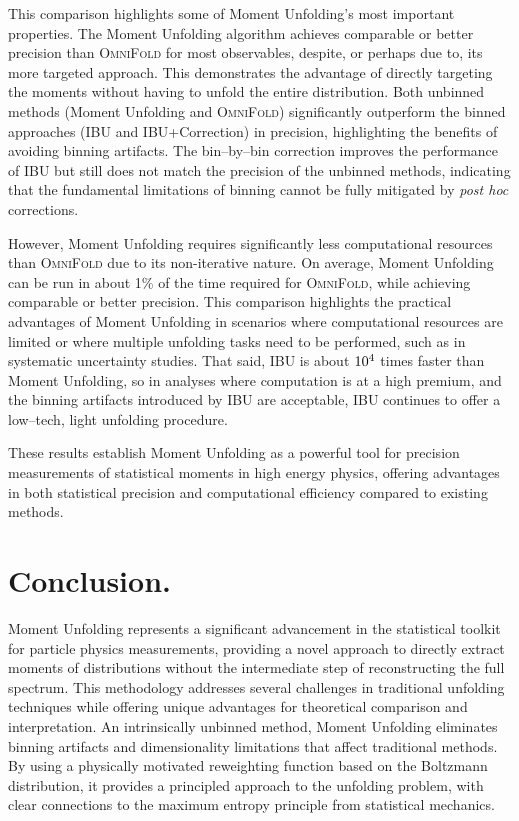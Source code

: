     This comparison highlights some of Moment Unfolding's most important properties.
    The Moment Unfolding algorithm achieves comparable or better precision than \textsc{\textsc{OmniFold}} for most observables, despite, or perhaps due to, its more targeted approach.
    This demonstrates the advantage of directly targeting the moments without having to unfold the entire distribution.
    Both unbinned methods (Moment Unfolding and \textsc{\textsc{OmniFold}}) significantly outperform the binned approaches (IBU and IBU+Correction) in precision, highlighting the benefits of avoiding binning artifacts.
    The bin--by--bin correction improves the performance of IBU but still does not match the precision of the unbinned methods, indicating that the fundamental limitations of binning cannot be fully mitigated by \textit{post hoc} corrections.
    
    However, Moment Unfolding requires significantly less computational resources than \textsc{\textsc{OmniFold}} due to its non-iterative nature.
    On average, Moment Unfolding can be run in about 1\% of the time required for {\textsc{OmniFold}}, while achieving comparable or better precision.
    This comparison highlights the practical advantages of Moment Unfolding in scenarios where computational resources are limited or where multiple unfolding tasks need to be performed, such as in systematic uncertainty studies.
    That said, IBU is about \(\num{d4}\) times faster than Moment Unfolding, so in analyses where computation is at a high premium, and the binning artifacts introduced by IBU are acceptable, IBU continues to offer a low--tech, light unfolding procedure.

    These results establish Moment Unfolding as a powerful tool for precision measurements of statistical moments in high energy physics, offering advantages in both statistical precision and computational efficiency compared to existing methods.

\section{Conclusion.}
    Moment Unfolding represents a significant advancement in the statistical toolkit for particle physics measurements, providing a novel approach to directly extract moments of distributions without the intermediate step of reconstructing the full spectrum.
    This methodology addresses several challenges in traditional unfolding techniques while offering unique advantages for theoretical comparison and interpretation.
    An intrinsically unbinned method, Moment Unfolding eliminates binning artifacts and dimensionality limitations that affect traditional methods.
    By using a physically motivated reweighting function based on the Boltzmann distribution, it provides a principled approach to the unfolding problem, with clear connections to the maximum entropy principle from statistical mechanics.

